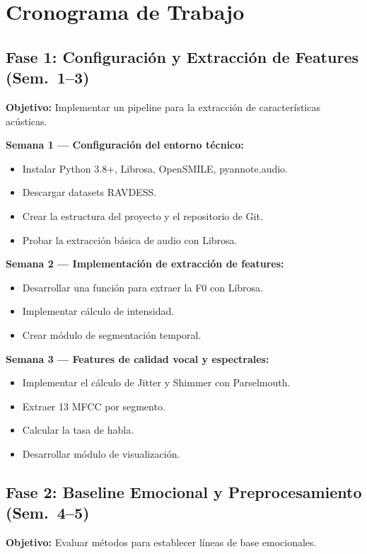 \section{Cronograma de Trabajo}

\subsection{Fase 1: Configuración y Extracción de Features (Sem.\ 1--3)}

\textbf{Objetivo:} Implementar un pipeline para la extracción de características
acústicas.

\textbf{Semana 1 — Configuración del entorno técnico:}
\begin{itemize}
    \item Instalar Python 3.8+, Librosa, OpenSMILE, pyannote.audio.
    \item Descargar datasets RAVDESS.
    \item Crear la estructura del proyecto y el repositorio de Git.
    \item Probar la extracción básica de audio con Librosa.
\end{itemize}

\textbf{Semana 2 — Implementación de extracción de features:}
\begin{itemize}
    \item Desarrollar una función para extraer la F0 con Librosa.
    \item Implementar cálculo de intensidad.
    \item Crear módulo de segmentación temporal.
\end{itemize}

\textbf{Semana 3 — Features de calidad vocal y espectrales:}
\begin{itemize}
    \item Implementar el cálculo de Jitter y Shimmer con Parselmouth.
    \item Extraer 13 MFCC por segmento.
    \item Calcular la tasa de habla.
    \item Desarrollar módulo de visualización.
\end{itemize}

\subsection{Fase 2: Baseline Emocional y Preprocesamiento (Sem.\ 4--5)}

\textbf{Objetivo:} Evaluar métodos para establecer líneas de base emocionales.

